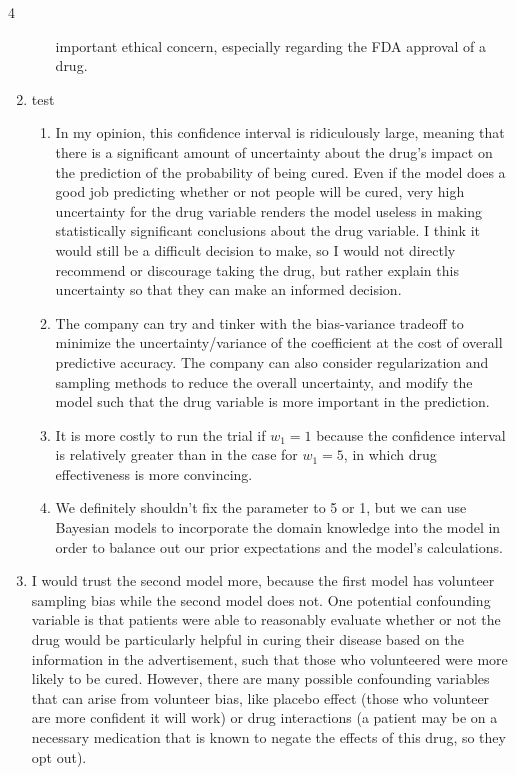 \documentclass[submit]{harvardml}
\begin{document}
\begin{sol}{}{4}
\begin{enumerate}
\begin{enumerate}
    important ethical concern, especially regarding the FDA approval of a drug. 
  \end{enumerate}
  \item test
  \begin{enumerate}
    \item In my opinion, this confidence interval is ridiculously large, meaning that there is
    a significant amount of uncertainty about the drug's impact on the prediction of
    the probability of being cured. Even if the model does a good job predicting whether
    or not people will be cured, very high uncertainty for the drug variable
    renders the model useless in making statistically significant conclusions about
    the drug variable. I think it would still be a difficult decision to make, so I would
    not directly recommend or discourage taking the drug, but rather explain this uncertainty
    so that they can make an informed decision.
    \item The company can try and tinker with the bias-variance tradeoff to minimize the
    uncertainty/variance of the coefficient at the cost of overall predictive accuracy.
    The company can also consider regularization and sampling methods to reduce the overall uncertainty,
    and modify the model such that the drug variable is more important in the prediction.
    \item It is more costly to run the trial if $w_1 = 1$ because the confidence interval
    is relatively greater than in the case for $w_1 = 5$, in which drug effectiveness is more
    convincing.
    \item We definitely shouldn't fix the parameter to 5 or 1, but we can use Bayesian
    models to incorporate the domain knowledge into the model in order to balance out our
    prior expectations and the model's calculations.
  \end{enumerate}
  \item I would trust the second model more, because the first model has volunteer sampling bias
  while the second model does not. One potential confounding variable is that patients
  were able to reasonably evaluate whether or not the drug would be particularly helpful in
  curing their disease based on the information in the advertisement, such that those
  who volunteered were more likely to be cured. However, there are many possible confounding
  variables that can arise from volunteer bias, like placebo effect (those who volunteer are
  more confident it will work) or drug interactions (a patient may be on a necessary medication
  that is known to negate the effects of this drug, so they opt out).
  \end{enumerate}
\end{sol}
\end{document}
